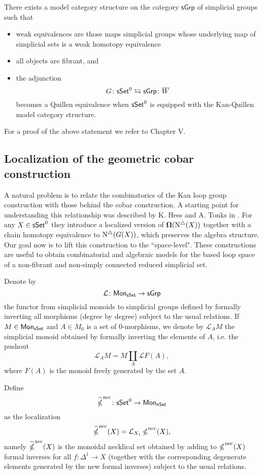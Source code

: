 \begin{theorem} \label{kan} There exists a model category structure on the category $\mathsf{sGrp}$ of simplicial groups such that 
\begin{itemize}
    \item weak equivalences are those maps simplicial groups whose underlying map of simplicial sets is a weak homotopy equivalence
    \item all objects are fibrant, and
\item the adjunction
$$G \colon \mathsf{sSet}^0 \leftrightarrows \mathsf{sGrp}\colon \overline{W}$$
becomes a Quillen equivalence when $\mathsf{sSet}^0$ is equipped with the Kan-Quillen model category structure.
\end{itemize}
\end{theorem}

For a proof of the above statement we refer to \cite{goerss2009simplicial} Chapter V. 

\subsection{Localization of the geometric cobar construction} A natural problem is to relate the combinatorics of the Kan loop group construction with those behind the cobar construction. A starting point for understanding this relationship was described by K. Hess and A. Tonks in \cite{hess2010cobar}. For any $X \in \mathsf{sSet}^0$ they introduce a localized version of $\operatorname{\mathbf{\Omega}}( \operatorname{N^{\triangle}}(X))$ together with a chain homotopy equivalence to $\operatorname{N^{\triangle}} (G(X))$, which preserves the algebra structure. Our goal now is to lift this construction to the ``space-level". These constructions are useful to obtain combinatorial and algebraic models for the based loop space of a non-fibrant and non-simply connected reduced simplicial set. 

Denote by $$\mathcal{L} \colon \mathsf{Mon}_{\mathsf{sSet}} \to \mathsf{sGrp}$$ the functor from simplicial monoids to simplicial groups defined by formally inverting all morphisms (degree by degree) subject to the usual relations. If $M \in \mathsf{Mon}_{\mathsf{sSet}}$ and $A \in M_0$ is a set of $0$-morphisms, we denote by $\mathcal{L}_AM$ the simplicial monoid obtained by formally inverting the elements of $A$, i.e. the pushout
$$\mathcal{L}_AM = M \coprod_{A} \mathcal{L}F(A),$$
where $F(A)$ is the monoid freely generated by the set $A$. 


Define 
$$\widehat{\operatorname{\mathbb{\Omega}}}^{\text{nec}} \colon \mathsf{sSet}^0 \to \mathsf{Mon}_{\mathsf{nSet}}$$
as the localization
$$\widehat{\operatorname{\mathbb{\Omega}}}^{\text{nec}}(X)= \mathcal{L}_{X_1}\operatorname{\mathbb{\Omega}}^{\text{nec}}(X),$$
namely $\widehat{\operatorname{\mathbb{\Omega}}}^{\text{nec}}(X)$ is the monoidal necklical set obtained by adding to $\operatorname{\mathbb{\Omega}}^{\text{nec}}(X)$  formal inverses for all $f\colon \Delta^1 \to X$ (together with the corresponding degenerate elements generated by the new formal inverses) subject to the usual relations. 

